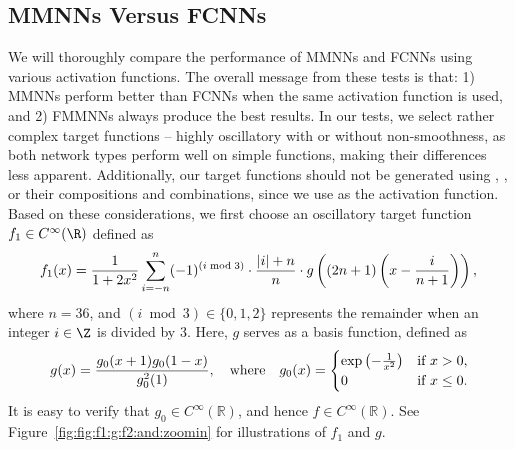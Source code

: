 \documentclass[11pt,a4paper]{article}
\begin{document}
\subsection{MMNNs Versus FCNNs}
\label{sec:FMMNN_vs_FCNN}





We will thoroughly compare the performance of MMNNs and FCNNs using various activation functions.
The overall message from these tests is that: 1) MMNNs perform better than FCNNs when the same activation function is used, and 2) FMMNNs always produce the best results. 
In our tests, we select rather complex target functions -- highly oscillatory with or without non-smoothness, as both network types perform well on simple functions, making their differences less apparent. Additionally, our target functions should not be generated using \sine, \cosine, or their compositions and combinations, since we use \sine{} as the activation function.
Based on these considerations, we first choose an oscillatory target function $f_1\in C^\infty(\R)$ defined as
\begin{equation}\label{eq:def:f1:Cinfty:MMNN:vs:FCNN}
    f_1(x) = \frac{1}{1 + 2x^2}\sum_{i=-n}^{n}   (-1)^{(i\bmod 3)}\cdot\frac{|i| + n}{ n}  \cdot g\left( (2n+1)\left(x-\frac{i}{n+1} \right)\right),\\
\end{equation}
where \( n = 36 \), and \( (i \bmod 3)\in \{0,1,2\} \) represents the remainder when an integer \( i\in\Z \) is divided by 3.
Here, $g$ serves as a basis function, defined as
\begin{equation*}
   g(x) = \frac{g_0(x+1) g_0(1-x)}{g_0^2(1)},\quad \textnormal{where}\quad g_0(x) =
\begin{cases}
 \exp\left(-\frac{1}{x^2}\right) &\textnormal{if}\   x > 0, \\
 0 & \textnormal{if}\  x \leq 0.
\end{cases}
\end{equation*}
It is easy to verify that \( g_0 \in C^\infty(\mathbb{R}) \), and hence \( f \in C^\infty(\mathbb{R}) \). See Figure~\ref{fig:fig:f1:g:f2:and:zoomin} for illustrations of \( f_1 \) and \( g \).
\end{document}
